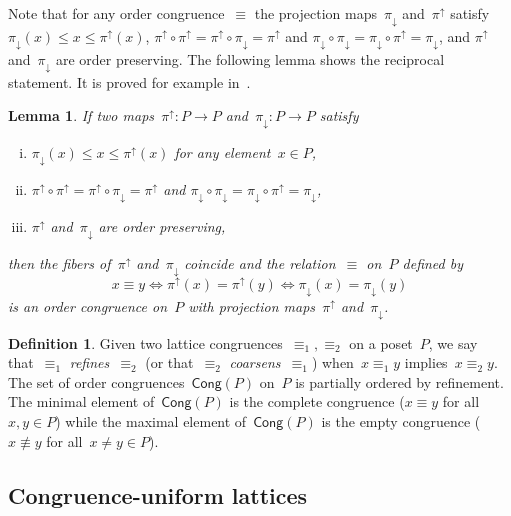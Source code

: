 \documentclass{amsart}
\newtheorem{lemma}[theorem]{Lemma}
\theoremstyle{definition}
\newtheorem{definition}[theorem]{Definition}
\newcommand{\darkblue}{\color{darkblue}} %
\newcommand{\defn}[1]{\textsl{\darkblue #1}} %
\newcommand{\projDown}{\pi_\downarrow} %
\newcommand{\projUp}{\pi^\uparrow} %
\newcommand{\Cong}{\mathsf{Cong}} %
\begin{document}
Note that for any order congruence~$\equiv$ the projection maps~$\projDown$ and~$\projUp$ satisfy~${\projDown(x) \le x \le \projUp(x)}$, ${\projUp \circ \projUp = \projUp \circ \projDown = \projUp}$ and ${\projDown \circ \projDown = \projDown \circ \projUp = \projDown}$, and $\projUp$ and~$\projDown$ are order preserving.
The following lemma shows the reciprocal statement.
It is proved for example in~\cite[Lem.~4.2]{DermenjianHohlwegPilaud}.

\begin{lemma}
\label{lem:conditionsProjectionMaps}
If two maps~$\projUp : P \to P$ and~$\projDown : P \to P$ satisfy
\begin{enumerate}[(i)]
\item
\label{item:conditionsProjectionMapsSandwich}
$\projDown(x) \le x \le \projUp(x)$ for any element~$x \in P$,

\item
\label{item:conditionsProjectionMapsLastWins}
$\projUp \circ \projUp = \projUp \circ \projDown = \projUp$ and $\projDown \circ \projDown = \projDown \circ \projUp = \projDown$,

\item
\label{item:conditionsProjectionMapsOrderPreserving}
$\projUp$ and~$\projDown$ are order preserving,
\end{enumerate}
then the fibers of~$\projUp$ and~$\projDown$ coincide and the relation~$\equiv$ on~$P$ defined by
\[
x \equiv y \iff \projUp(x) = \projUp(y) \iff \projDown(x) = \projDown(y)
\]
is an order congruence on~$P$ with projection maps~$\projUp$ and~$\projDown$.
\end{lemma}

\begin{definition}
Given two lattice congruences~$\equiv_1, \equiv_2$ on a poset~$P$, we say that~$\equiv_1$ \defn{refines}~$\equiv_2$ (or that~$\equiv_2$ \defn{coarsens}~$\equiv_1$) when~$x \equiv_1 y$ implies~$x \equiv_2 y$.
The set of order congruences~$\Cong(P)$ on~$P$ is partially ordered by refinement.
The minimal element of~$\Cong(P)$ is the complete congruence ($x \equiv y$ for all~$x,y \in P$) while the maximal element of~$\Cong(P)$ is the empty congruence ($x \not\equiv y$ for all~$x \ne y \in P$).
\end{definition}

\subsection{Congruence-uniform lattices}
\label{subsec:congruenceUniformLattices}
\end{document}
